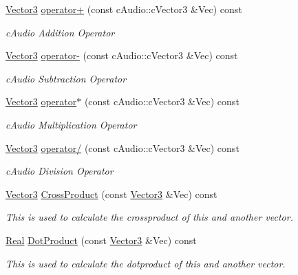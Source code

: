 \begin{DoxyCompactItemize}
\hyperlink{classphys_1_1Vector3}{Vector3} \hyperlink{classphys_1_1Vector3_aef08d2451bb4959e02f1b09067284b5c}{operator+} (const cAudio::cVector3 \&Vec) const 
\begin{DoxyCompactList}\small\item\em cAudio Addition Operator \item\end{DoxyCompactList}\item 
\hyperlink{classphys_1_1Vector3}{Vector3} \hyperlink{classphys_1_1Vector3_a84bcf6d8e0c850e32c642f1b634d38e9}{operator-\/} (const cAudio::cVector3 \&Vec) const 
\begin{DoxyCompactList}\small\item\em cAudio Subtraction Operator \item\end{DoxyCompactList}\item 
\hyperlink{classphys_1_1Vector3}{Vector3} \hyperlink{classphys_1_1Vector3_a8bfb89d47b4aceed530fe81202c6f368}{operator$\ast$} (const cAudio::cVector3 \&Vec) const 
\begin{DoxyCompactList}\small\item\em cAudio Multiplication Operator \item\end{DoxyCompactList}\item 
\hyperlink{classphys_1_1Vector3}{Vector3} \hyperlink{classphys_1_1Vector3_ad2e1c9f24ea2127380e772058a91130c}{operator/} (const cAudio::cVector3 \&Vec) const 
\begin{DoxyCompactList}\small\item\em cAudio Division Operator \item\end{DoxyCompactList}\item 
\hyperlink{classphys_1_1Vector3}{Vector3} \hyperlink{classphys_1_1Vector3_ad9f0c1eee59e8a0d221eca49f49e0970}{CrossProduct} (const \hyperlink{classphys_1_1Vector3}{Vector3} \&Vec) const 
\begin{DoxyCompactList}\small\item\em This is used to calculate the crossproduct of this and another vector. \item\end{DoxyCompactList}\item 
\hyperlink{namespacephys_af7eb897198d265b8e868f45240230d5f}{Real} \hyperlink{classphys_1_1Vector3_a1f5f1ad3c7e67a1e88b461d2b2ea5a8d}{DotProduct} (const \hyperlink{classphys_1_1Vector3}{Vector3} \&Vec) const 
\begin{DoxyCompactList}\small\item\em This is used to calculate the dotproduct of this and another vector. \item\end{DoxyCompactList}\item 

\end{DoxyCompactItemize}
